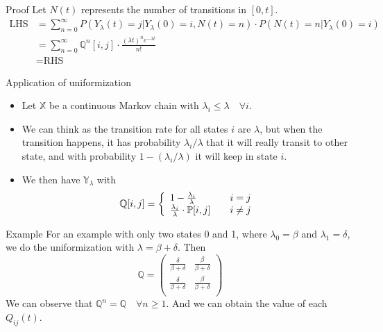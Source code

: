 \documentclass[mathserif]{beamer}
\begin{document}
\begin{frame}{Proof}
Let $N(t)$ represents the number of transitions in $[0,t]$.
\begin{align*}
\text{LHS} & = \sum_{n=0}^\infty P(Y_\lambda(t)=j | Y_\lambda(0)=i, N(t)=n)
\cdot P(N(t)=n | Y_\lambda(0)=i) \\
& = \sum_{n=0}^\infty \mathbb{Q}^n[i,j]\cdot \frac{(\lambda t)^n e^{-\lambda t}}{n!} \\
& = \text{RHS}
\end{align*}
\end{frame}

\begin{frame}{Application of uniformization}
\begin{itemize}
\item Let $\mathbb{X}$ be a continuous Markov chain with $\lambda_i\leq \lambda\quad\forall i$.
\item We can think as the transition rate for all states $i$ are $\lambda$, but when the transition happens, it has probability $\lambda_i / \lambda$ that it will really transit to other state, and with probability $1 - (\lambda_i / \lambda)$ it will keep in state $i$.
\item We then have $\mathbb{Y}_\lambda$ with
\[
\mathbb{Q}[i,j] = \left\{
\begin{array}{l l}
1 - \frac{\lambda_i}{\lambda} & \quad i=j \\
\frac{\lambda_i}{\lambda}\cdot \mathbb{P}[i,j] & \quad i\neq j \\
\end{array}
\right.
\]
\end{itemize}
\end{frame}

\begin{frame}{Example}
For an example with only two states 0 and 1, where $\lambda_0 = \beta$ and $\lambda_1 = \delta$,
we do the uniformization with $\lambda = \beta + \delta$.
Then
\[
\mathbb{Q} = \begin{pmatrix}
\frac{\delta}{\beta + \delta} & \frac{\beta}{\beta + \delta} \\
\frac{\delta}{\beta + \delta} & \frac{\beta}{\beta + \delta} \\
\end{pmatrix}
\]
We can observe that $\mathbb{Q}^n = \mathbb{Q} \quad\forall n\geq 1$.
And we can obtain the value of each $Q_{ij}(t)$.
\end{frame}
\end{document}
